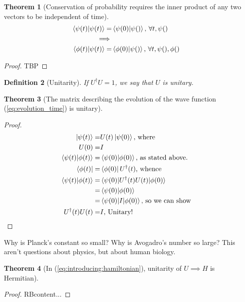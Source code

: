 \documentclass[]{article}
\newtheorem{thm}{Theorem}
\newtheorem{defn}[thm]{Definition}
\begin{document}
\begin{thm}[Conservation of probability requires the inner product of any two vectors to be independent of time]
	\begin{align*}
		\braket{\psi(t)\vert \psi(t)} =& \braket{\psi(0)\vert \psi()} \text{, $\forall t, \psi()$}\\
		\implies&\\
		\braket{\phi(t)\vert \psi(t)} =& \braket{\phi(0)\vert \psi()} \text{, $\forall t, \psi(), \phi()$}
	\end{align*}
\end{thm}
\begin{proof}
	TBP
\end{proof}
\begin{defn}[Unitarity]
	If $U^\dagger U=1$, we say that $U$ is unitary.
\end{defn}

\begin{thm}[The matrix describing the evolution of the wave function (\ref{eq:evolution_time}) is unitary]
\end{thm}
\begin{proof}
	\begin{align*}
		\ket{\psi(t)} =& U(t) \ket{\psi(0)} \text{, where} \\
		U(0) =& I\\
		\braket{\psi(t)\vert\phi(t)} =& \braket{\psi(0)\vert\phi(0)} \text{, as stated above.}\\
		\bra{\phi(t)} =& \bra{\phi(0)} U^\dagger(t) \text{, whence}\\
		\braket{\psi(t)\vert\phi(t)} =& \braket{\psi(0)\vert U^\dagger(t) U(t)\vert\phi(0)}\\
		=& \braket{\psi(0)\vert\phi(0)} \\
		=& \braket{\psi(0)\vert I \vert \phi(0)} \text{, so we can show}\\
		U^\dagger(t) U(t)=& I \text {, Unitary!}
	\end{align*}
\end{proof}

Why is Planck's constant so small? Why is Avogadro's number so large? This aren't questions about physics, but about human biology.

\begin{thm}[In (\ref{eq:introducing:hamiltonian}),  unitarity of $U\implies H$ is Hermitian]
\end{thm}
\begin{proof}
	RB{content...}
\end{proof}
\end{document}
